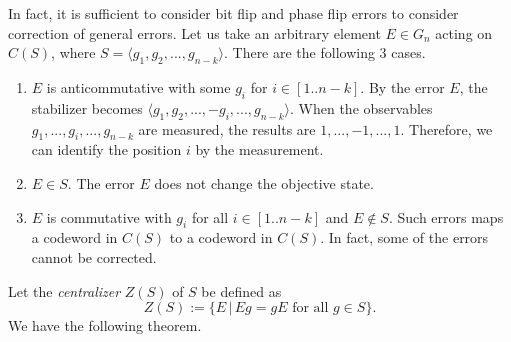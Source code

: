 In fact, it is sufficient to
consider bit flip and phase flip errors
to consider correction of general errors.
Let us take an arbitrary element $E \in G_n$ acting on
$C(S)$, where $S = \langle g_1, g_2,..., g_{n-k} \rangle$.
There are the following 3 cases.
\begin{enumerate}
 \item $E$ is anticommutative with some $g_i$ for $i \in [1..n-k]$.
       By the error $E$, the stabilizer becomes 
       $\langle g_1, g_2,...,-g_i,...,g_{n-k} \rangle$.
       When the observables \\
       $g_1,...,g_i,...,g_{n-k}$ are measured,
       the results are $1,...,-1,...,1$. Therefore, we
       can identify the position $i$ by the measurement.
 \item $E \in S$. The error $E$ does not change the objective state.
 \item $E$ is commutative with $g_i$ for all $i \in [1..n-k]$ and 
       $E \notin S$. Such errors maps a codeword in $C(S)$ to
       a codeword in $C(S)$.
       In fact, some of the errors cannot be corrected.
\end{enumerate}

Let the \emph{centralizer} $Z(S)$ of $S$ be defined as
\[
Z(S) := \{E \,|\, Eg=gE \mbox{ for all } g \in S \}.
\]
We have the following theorem.

